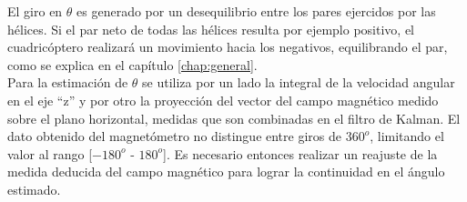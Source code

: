 \documentclass[main]{subfiles}
\begin{document}
El giro en $\theta$ es generado por un desequilibrio entre los pares ejercidos por las h\'elices. Si el par neto de todas las h\'elices resulta por ejemplo positivo, el cuadric\'optero realizar\'a un movimiento hacia los negativos, equilibrando el par, como se explica en el cap\'itulo \ref{chap:general}.\\

Para la estimaci\'on de $\theta$ se utiliza por un lado la integral de la velocidad angular en el eje ``z'' y por otro la proyecci\'on del vector del campo magn\'etico medido sobre el plano horizontal, medidas que son combinadas en el filtro de Kalman. El dato obtenido del magnet\'ometro no distingue entre giros de $360^o$, limitando el valor al rango [$-180^o$ - $180^o$]. Es necesario entonces realizar un reajuste de la medida deducida del campo magn\'etico para lograr la continuidad en el \'angulo estimado.\\
\end{document}

